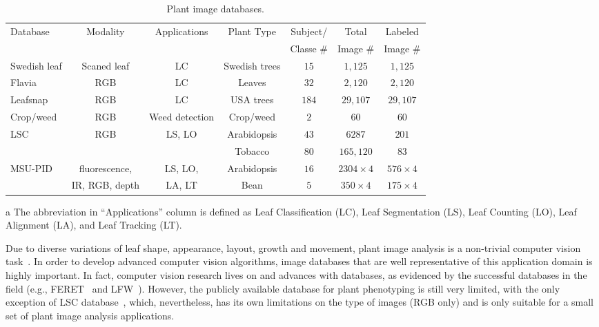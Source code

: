 \begin{table}[t!]
\centering
\begin{threeparttable}
\caption{Plant image databases.}
\begin{tabular}{l|c|c|c|c|c|c}
\hline
\multirow{2}{*}{Database}& \multirow{2}{*}{Modality} & \multirow{2}{*}{Applications}\tnote{a} & \multirow{2}{*}{Plant Type} & Subject/ &Total & Labeled \\
& & & & Classe \# & Image \# & Image \# \\ \hline
Swedish leaf & Scaned leaf & LC& Swedish trees & $15$ & $1,125$ & $1,125$ \\ \hline
Flavia & RGB & LC& Leaves & $32$ & $2,120$ & $2,120$ \\ \hline
Leafsnap & RGB & LC& USA trees & $184$ & $29,107$ & $29,107$ \\ \hline
Crop/weed & RGB &Weed detection & Crop/weed & $2$ & $60$ & $60$ \\ \hline
\multirow{2}{*}{LSC} & \multirow{2}{*}{RGB} & \multirow{2}{*}{LS, LO} & Arabidopsis & $43$ & $6287$ & $201$ \\ \cline{4-7}
& & & Tobacco & $80$ & $165,120$ & $83$ \\ \hline
\multirow{2}{*}{MSU-PID} & fluorescence, & LS, LO, & Arabidopsis & $16$ & $2304\times 4$ & $576\times 4$ \\ \cline{4-7}
& IR, RGB, depth & LA, LT & Bean & $5$ & $350\times 4$ & $175\times 4$ \\ \hline
\hline
\end{tabular}
\begin{tablenotes}
\footnotesize
\item[a] The abbreviation in ``Applications'' column is defined as Leaf Classification (LC), Leaf Segmentation (LS), Leaf Counting (LO), Leaf Alignment (LA), and Leaf Tracking (LT).
\end{tablenotes}
\end{threeparttable}
\label{tab:database}
\end{table}

Due to diverse variations of leaf shape, appearance, layout, growth and movement, plant image analysis is a non-trivial computer vision task~\cite{Minervini2015}.
In order to develop advanced computer vision algorithms, image databases that are well representative of this application domain is highly important.
In fact, computer vision research lives on and advances with databases, as evidenced by the successful databases in the field (e.g., FERET~\cite{Phillips2000} and LFW~\cite{LFW}).
However, the publicly available database for plant phenotyping is still very limited, with the only exception of LSC database~\cite{scharr2014annotated}, which, nevertheless, has its own limitations on the type of images (RGB only) and is only suitable for a small set of plant image analysis applications.



